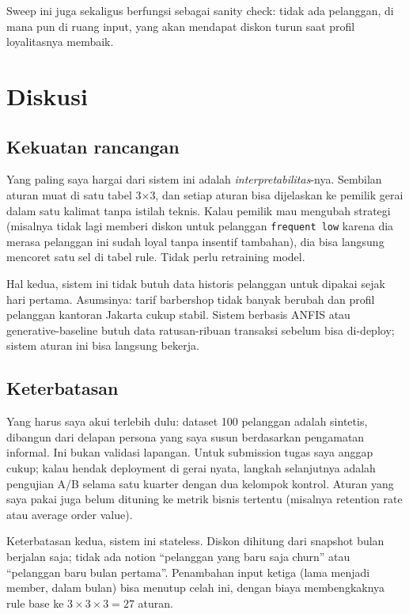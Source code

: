 \documentclass[conference]{IEEEtran}
\begin{document}
Sweep ini juga sekaligus berfungsi sebagai sanity check: tidak ada
pelanggan, di mana pun di ruang input, yang akan mendapat diskon turun
saat profil loyalitasnya membaik.

\section{Diskusi}

\subsection{Kekuatan rancangan}

Yang paling saya hargai dari sistem ini adalah \emph{interpretabilitas}-nya.
Sembilan aturan muat di satu tabel 3$\times$3, dan setiap aturan bisa
dijelaskan ke pemilik gerai dalam satu kalimat tanpa istilah teknis. Kalau
pemilik mau mengubah strategi (misalnya tidak lagi memberi diskon untuk
pelanggan \texttt{frequent low} karena dia merasa pelanggan ini sudah
loyal tanpa insentif tambahan), dia bisa langsung mencoret satu sel
di tabel rule.
Tidak perlu retraining model.

Hal kedua, sistem ini tidak butuh data historis pelanggan untuk dipakai
sejak hari pertama. Asumsinya: tarif barbershop tidak banyak berubah dan
profil pelanggan kantoran Jakarta cukup stabil. Sistem berbasis ANFIS atau
generative-baseline butuh data ratusan-ribuan transaksi sebelum bisa
di-deploy; sistem aturan ini bisa langsung bekerja.

\subsection{Keterbatasan}

Yang harus saya akui terlebih dulu: dataset 100 pelanggan adalah
sintetis, dibangun dari delapan persona yang saya susun berdasarkan
pengamatan informal. Ini bukan validasi lapangan. Untuk submission tugas
saya anggap cukup; kalau hendak deployment di gerai nyata, langkah
selanjutnya adalah pengujian A/B selama satu kuarter dengan dua kelompok
kontrol. Aturan yang saya pakai juga belum dituning ke metrik bisnis
tertentu (misalnya retention rate atau average order value).

Keterbatasan kedua, sistem ini stateless. Diskon dihitung dari snapshot
bulan berjalan saja; tidak ada notion ``pelanggan yang baru saja churn''
atau ``pelanggan baru bulan pertama''. Penambahan input ketiga (lama
menjadi member, dalam bulan) bisa menutup celah ini, dengan biaya
membengkaknya rule base ke $3 \times 3 \times 3 = 27$ aturan.
\end{document}
